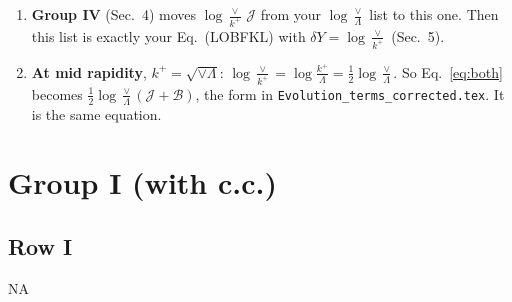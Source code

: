 \documentclass[9pt]{article}
\newcommand{\new}[1]{{\color{blue}#1}}
\numberwithin{equation}{section}
\begin{document}
\begin{enumerate}
\new{BFKL comes only with $\log\frac{\vee}{k^+}$, and JIMWLK only with $\log\frac{k^+}{\Lambda}$, as I said before. The $-\mathcal J$ of this list is not a new claim: your JIMWLK terms are written with $\log\frac{\vee}{\Lambda}=\log\frac{k^+}{\Lambda}+\log\frac{\vee}{k^+}$, and the $-\mathcal J\log\frac{\vee}{k^+}$ here removes the second piece.}
\item \new{\textbf{Group IV} (Sec.~4) moves $\log\frac{\vee}{k^+}\,\mathcal J$ from your $\log\frac{\vee}{\Lambda}$ list to this one. Then this list is exactly your Eq.~(LOBFKL) with $\delta Y=\log\frac{\vee}{k^+}$ (Sec.~5).}
\item \new{\textbf{At mid rapidity}, $k^+=\sqrt{\vee\Lambda}$: $\log\frac{\vee}{k^+}=\log\frac{k^+}{\Lambda}=\frac12\log\frac{\vee}{\Lambda}$. So Eq.~\eqref{eq:both} becomes $\frac12\log\frac{\vee}{\Lambda}(\mathcal J+\mathcal B)$, the form in \texttt{Evolution\_terms\_corrected.tex}. It is the same equation.}
\end{enumerate}

\section{Group I (with c.c.)}
\subsection{Row I}
\textsc{NA}
\end{document}
